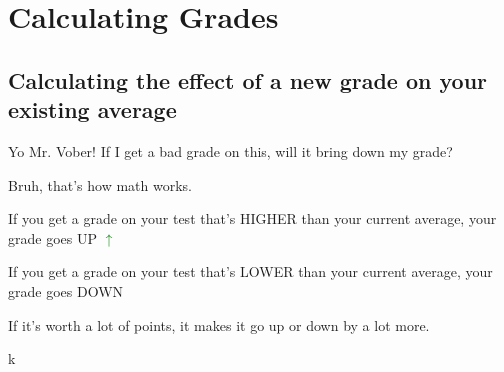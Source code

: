 \documentclass[../main.tex]{subfiles}
\begin{document}
\chapter{Calculating Grades}

\section{Calculating the effect of a new grade on your existing average}

\begin{tcolorbox}[colback=white,]

	\begin{rightbubbles}
	Yo Mr. Vober! If I get a bad grade on this, will it bring down my grade?
	\end{rightbubbles}

	\begin{leftbubbles}
	Bruh, that's how math works.

	If you get a grade on your test that's HIGHER than your current average, your grade goes UP \textbf{\textcolor{green}{$\uparrow$}}

	If you get a grade on your test that's LOWER than your current average, your grade goes DOWN \textbf{\dracRed{$\downarrow$}}

	If it's worth a lot of points, it makes it go up or down by a lot more.
	\end{leftbubbles}

	\begin{rightbubbles}
	k
	\end{rightbubbles}

\end{tcolorbox}
\end{document}
